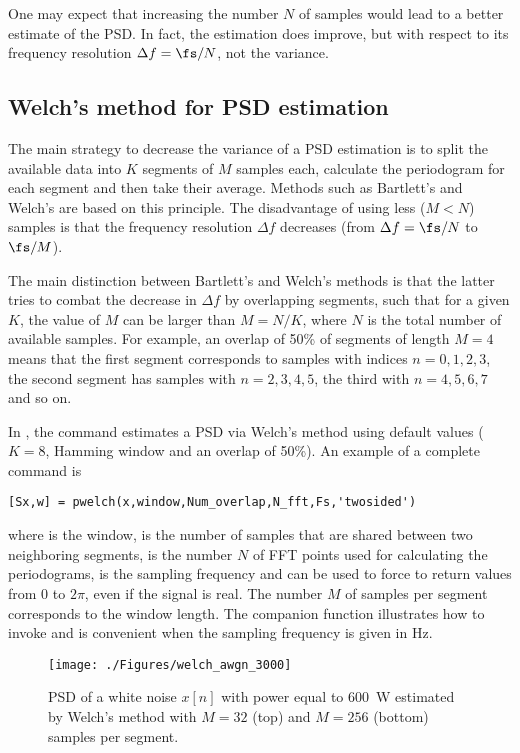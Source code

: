 One may expect that increasing the number $N$ of samples would lead to a better estimate of the PSD. In fact, the estimation does improve, but with respect to its frequency resolution $\Delta f=\fs/N$, not the variance.

\subsection{Welch's method for PSD estimation}

The main strategy to decrease the variance of a PSD estimation is to split the available data into $K$ segments of $M$ samples each, calculate the periodogram for each segment and then take their average. Methods such as Bartlett's and Welch's are based on this principle.
The disadvantage of using less ($M < N$) samples is that the frequency resolution $\Delta f$ decreases (from $\Delta f=\fs/N$ to $\fs/M$).

The main distinction between Bartlett's and Welch's methods is that the latter tries to combat the decrease in $\Delta f$ by overlapping segments, such that for a given $K$, the value of $M$ can be larger than $M=N/K$, where $N$ is the total number of available samples. For example, an overlap of 50\% of segments of length $M=4$ means that the first segment corresponds to samples with indices $n=0,1,2,3$, the second segment has samples with $n=2,3,4,5$, the third with $n=4,5,6,7$ and so on.

In {\matlab}, the command  estimates a PSD via Welch's method using default values ($K=8$, Hamming window and an overlap of 50\%). An example of a complete command is
\begin{lstlisting}
[Sx,w] = pwelch(x,window,Num_overlap,N_fft,Fs,'twosided')
\end{lstlisting}
where  is the window,  is the number of samples that are shared between two neighboring segments,  is the number $N$ of FFT points used for calculating the periodograms,  is the sampling frequency and  can be used to force  to return values from 0 to $2\pi$, even if the signal is real. The number $M$ of samples per segment corresponds to the window length.
The companion function  illustrates how to invoke  and is convenient when the sampling frequency is given in Hz.

\begin{figure}[htbp]
\centering
\texttt{[image: ./Figures/welch\_awgn\_3000]}
\caption{PSD of a white noise $x[n]$ with power equal to 600~W estimated by Welch's method with $M=32$ (top) and $M=256$ (bottom) samples per segment.\label{fig:welch_awgn_3000}}
\end{figure}


